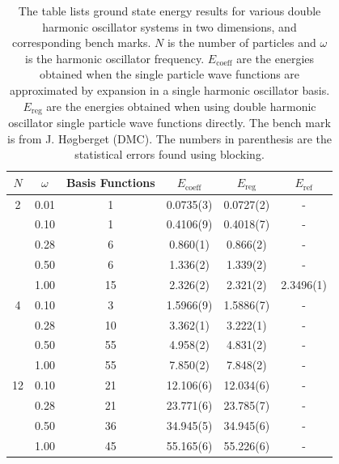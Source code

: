 \documentclass[../main.tex]{subfiles}
\begin{document}
\begin{table}[!ht]
  \centering
  \begin{tabular}{c c c c c c}
    \hline
    \hline
    $N$ & $\omega$ & Basis Functions & $E_\textrm{coeff}$ & $E_\textrm{reg}$ & $E_\textrm{ref}$ \\*
    \hline
    2 & 0.01 & 1 & 0.0735(3) & 0.0727(2) & - \\*
      & 0.10 & 1 & 0.4106(9) & 0.4018(7) & -  \\*
      & 0.28 & 6 & 0.860(1) & 0.866(2) & - \\*
      & 0.50 & 6 & 1.336(2) & 1.339(2) & - \\*
      & 1.00 & 15 & 2.326(2) & 2.321(2) & 2.3496(1) \vspace{2 mm}\\*
      
    4 & 0.10 & 3 & 1.5966(9) & 1.5886(7) & - \\*
      & 0.28 & 10 & 3.362(1) & 3.222(1) & - \\*
      & 0.50 & 55 & 4.958(2) & 4.831(2) & - \\*
      & 1.00 & 55 & 7.850(2) & 7.848(2) & - \vspace{2 mm}\\*
      
    12 & 0.10 & 21 & 12.106(6) & 12.034(6) & - \\*
       & 0.28 & 21 & 23.771(6) & 23.785(7) & - \\*
       & 0.50 & 36 & 34.945(5) & 34.945(6) & - \\*
       & 1.00 & 45 & 55.165(6) & 55.226(6) & - \\*
    \hline
    \hline
  \end{tabular}
  \caption{The table lists ground state energy results for various double harmonic oscillator systems in two dimensions, and corresponding bench marks. $N$ is the number of particles and $\omega$ is the harmonic oscillator frequency. $E_\textrm{coeff}$ are the energies obtained when the single particle wave functions are approximated by expansion in a single harmonic oscillator basis. $E_\textrm{reg}$ are the energies obtained when using double harmonic oscillator single particle wave functions directly. The bench mark is from J. Høgberget \cite{Jorgen} (DMC). The numbers in parenthesis are the statistical errors found using blocking.}
  \label{tab: EnergiesDHO2D}
\end{table}
\end{document}
